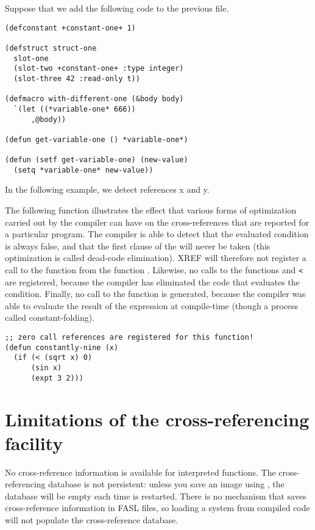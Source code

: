 Suppose that we add the following code to the previous file. 

\begin{verbatim}
(defconstant +constant-one+ 1)
  
(defstruct struct-one
  slot-one
  (slot-two +constant-one+ :type integer)
  (slot-three 42 :read-only t))

(defmacro with-different-one (&body body)
  `(let ((*variable-one* 666))
      ,@body))

(defun get-variable-one () *variable-one*)

(defun (setf get-variable-one) (new-value)
  (setq *variable-one* new-value))
\end{verbatim}

In the following example, we detect references x and y.





The following function illustrates the effect that various forms of
optimization carried out by the \cmucl{} compiler can have on the
cross-references that are reported for a particular program. The
compiler is able to detect that the evaluated condition is always
false, and that the first clause of the  will never be taken
(this optimization is called dead-code elimination). XREF will
therefore not register a call to the function  from the
function . Likewise, no calls to the functions 
and \verb|<| are registered, because the compiler has eliminated the
code that evaluates the condition. Finally, no call to the function
 is generated, because the compiler was able to evaluate
the result of the expression  at compile-time (though
a process called constant-folding).

\begin{verbatim}
;; zero call references are registered for this function!
(defun constantly-nine (x)
  (if (< (sqrt x) 0)
      (sin x)
      (expt 3 2)))
\end{verbatim}


\section{Limitations of the cross-referencing facility}

No cross-reference information is available for interpreted functions.
The cross-referencing database is not persistent: unless you save an
image using , the database will be empty each time
\cmucl{} is restarted. There is no mechanism that saves
cross-reference information in FASL files, so loading a system from
compiled code will not populate the cross-reference database.

